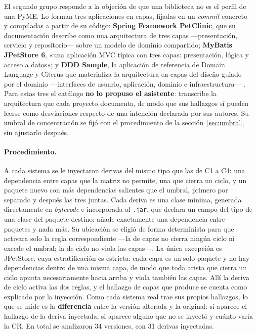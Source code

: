 El segundo grupo responde a la objeción de que una biblioteca no es el perfil de una PyME. Lo forman tres aplicaciones en capas, fijadas en un \textit{commit} concreto y compiladas a partir de su código: \textbf{Spring Framework PetClinic}, que su documentación describe como una arquitectura de tres capas ---presentación, servicio y repositorio--- sobre un modelo de dominio compartido; \textbf{MyBatis JPetStore 6}, «una aplicación MVC típica con tres capas: presentación, lógica y acceso a datos»; y \textbf{DDD Sample}, la aplicación de referencia de Domain Language y Citerus que materializa la arquitectura en capas del diseño guiado por el dominio ---interfaces de usuario, aplicación, dominio e infraestructura--- \citep{Evans2003}. Para estas tres el catálogo \textbf{no lo propuso el asistente}: transcribe la arquitectura que cada proyecto documenta, de modo que sus hallazgos sí pueden leerse como desviaciones respecto de una intención declarada por sus autores. Su umbral de concentración se fijó con el procedimiento de la sección~\ref{sec:umbral}, sin ajustarlo después.

\paragraph{Procedimiento.} A cada sistema se le inyectaron derivas del mismo tipo que las de C1 a C4: una dependencia entre capas que la matriz no permite, una que cierra un ciclo, y un paquete nuevo con más dependencias salientes que el umbral, primero por separado y después las tres juntas. Cada deriva es una clase mínima, generada directamente en \textit{bytecode} e incorporada al \texttt{.jar}, que declara un campo del tipo de una clase del paquete destino: añade exactamente una dependencia entre paquetes y nada más. Su ubicación se eligió de forma determinista para que activara solo la regla correspondiente ---la de capas no cierra ningún ciclo ni excede el umbral; la de ciclo no viola las capas---. La única excepción es JPetStore, cuya estratificación es estricta: cada capa es un solo paquete y no hay dependencias dentro de una misma capa, de modo que toda arista que cierra un ciclo apunta necesariamente hacia arriba y viola también las capas. Allí la deriva de ciclo activa las dos reglas, y el hallazgo de capas que produce se cuenta como explicado por la inyección. Como cada sistema real trae sus propios hallazgos, lo que se mide es la \textbf{diferencia} entre la versión alterada y la original: si aparece el hallazgo de la deriva inyectada, si aparece alguno que no se inyectó y cuánto varía la CR. En total se analizaron 34 versiones, con 31 derivas inyectadas.

